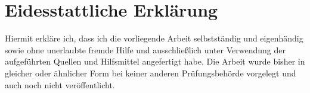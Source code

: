 \section*{Eidesstattliche Erklärung}
Hiermit erkläre ich, dass ich die vorliegende Arbeit selbstständig und eigenhändig sowie ohne unerlaubte fremde Hilfe und ausschließlich unter Verwendung der aufgeführten Quellen und Hilfsmittel angefertigt habe. Die Arbeit wurde bisher in gleicher oder ähnlicher Form bei keiner anderen Prüfungsbehörde vorgelegt und auch noch nicht veröffentlicht.\\[2cm]
\signature{Berlin}{\theauthor}
